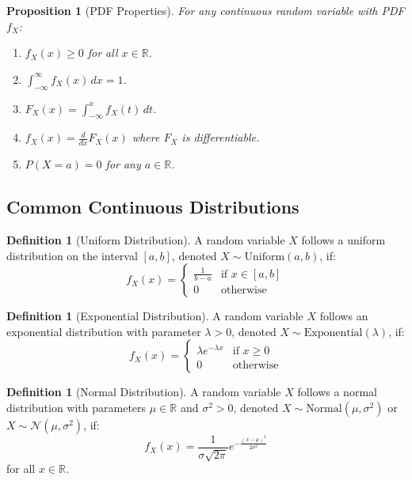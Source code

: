 \documentclass[12pt,a4paper]{article}
\theoremstyle{plain}
\newtheorem{proposition}[theorem]{Proposition}
\theoremstyle{definition}
\newtheorem{definition}[theorem]{Definition}
\begin{document}
\begin{proposition}[PDF Properties]
For any continuous random variable with PDF $f_X$:
\begin{enumerate}[label=(\roman*)]
\item $f_X(x) \geq 0$ for all $x \in \mathbb{R}$.
\item $\int_{-\infty}^{\infty} f_X(x) \, dx = 1$.
\item $F_X(x) = \int_{-\infty}^x f_X(t) \, dt$.
\item $f_X(x) = \frac{d}{dx}F_X(x)$ where $F_X$ is differentiable.
\item $P(X = a) = 0$ for any $a \in \mathbb{R}$.
\end{enumerate}
\end{proposition}

\subsection{Common Continuous Distributions}

\begin{definition}[Uniform Distribution]
A random variable $X$ follows a uniform distribution on the interval $[a,b]$, denoted $X \sim \text{Uniform}(a,b)$, if:
\begin{equation}
f_X(x) = 
\begin{cases}
\frac{1}{b-a} & \text{if } x \in [a,b] \\
0 & \text{otherwise}
\end{cases}
\end{equation}
\end{definition}

\begin{definition}[Exponential Distribution]
A random variable $X$ follows an exponential distribution with parameter $\lambda > 0$, denoted $X \sim \text{Exponential}(\lambda)$, if:
\begin{equation}
f_X(x) = 
\begin{cases}
\lambda e^{-\lambda x} & \text{if } x \geq 0 \\
0 & \text{otherwise}
\end{cases}
\end{equation}
\end{definition}

\begin{definition}[Normal Distribution]
A random variable $X$ follows a normal distribution with parameters $\mu \in \mathbb{R}$ and $\sigma^2 > 0$, denoted $X \sim \text{Normal}(\mu, \sigma^2)$ or $X \sim \mathcal{N}(\mu, \sigma^2)$, if:
\begin{equation}
f_X(x) = \frac{1}{\sigma\sqrt{2\pi}} e^{-\frac{(x-\mu)^2}{2\sigma^2}}
\end{equation}
for all $x \in \mathbb{R}$.
\end{definition}
\end{document}
